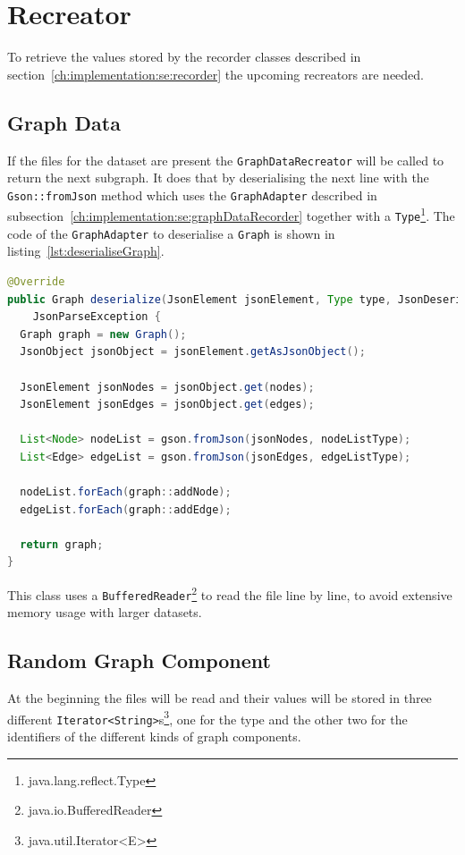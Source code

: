 \section{Recreator}
\label{ch:implementation:se:recreator}
To retrieve the values stored by the recorder classes described in section~\ref{ch:implementation:se:recorder} the upcoming recreators are needed.

\subsection{Graph Data}
If the files for the dataset are present the \texttt{GraphDataRecreator} will be called to return the next subgraph.
It does that by deserialising the next line with the \texttt{Gson::fromJson} method which uses the \texttt{GraphAdapter} described in subsection~\ref{ch:implementation:se:graphDataRecorder} together with a \texttt{Type}\footnote{java.lang.reflect.Type}.
The code of the \texttt{GraphAdapter} to deserialise a \texttt{Graph} is shown in listing~\ref{lst:deserialiseGraph}.

\begin{lstlisting}[language=Java,label={lst:deserialiseGraph},caption={Deserialisation of a \texttt{Graph} object.},captionpos=b]
@Override
public Graph deserialize(JsonElement jsonElement, Type type, JsonDeserializationContext context) throws
    JsonParseException {
  Graph graph = new Graph();
  JsonObject jsonObject = jsonElement.getAsJsonObject();

  JsonElement jsonNodes = jsonObject.get(nodes);
  JsonElement jsonEdges = jsonObject.get(edges);

  List<Node> nodeList = gson.fromJson(jsonNodes, nodeListType);
  List<Edge> edgeList = gson.fromJson(jsonEdges, edgeListType);

  nodeList.forEach(graph::addNode);
  edgeList.forEach(graph::addEdge);

  return graph;
}
\end{lstlisting}

This class uses a \texttt{BufferedReader}\footnote{java.io.BufferedReader} to read the file line by line,
to avoid extensive memory usage with larger datasets.

\subsection{Random Graph Component}
\label{ch:implementation:se:randomGraphComponentRecreator}
At the beginning the files will be read and their values will be stored in three different \texttt{Iterator<String>}s\footnote{java.util.Iterator<E>},
one for the type and the other two for the identifiers of the different kinds of graph components.

